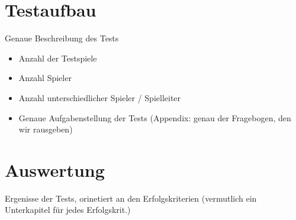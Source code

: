 \section{Testaufbau}
\label{sec:Testaufbau}
Genaue Beschreibung des Tests

\begin{itemize}
	\item Anzahl der Testspiele
	\item Anzahl Spieler
	\item Anzahl unterschiedlicher Spieler / Spielleiter
	\item Genaue Aufgabenstellung der Tests (Appendix: genau der Fragebogen, den wir rausgeben)
\end{itemize}


\section{Auswertung}
\label{sec:Auswertung}
Ergenisse der Tests, orinetiert an den Erfolgskriterien (vermutlich ein Unterkapitel für jedes Erfolgskrit.)